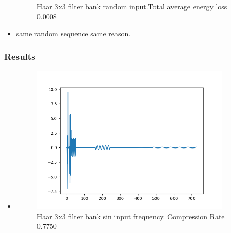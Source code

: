\documentclass{beamer}
\begin{document}
\begin{frame}
\begin{itemize}
\begin{figure}[ht!]
\begin{minipage}{0.45\textwidth}
                      \caption{Haar 3x3 filter bank random input.Total average energy loss 0.0008}
                  \end{minipage}
              \end{figure}
        \item same random sequence same reason.
    \end{itemize}
\end{frame}
\begin{frame}
    \frametitle{Results}
    \begin{itemize}
        \item
              \begin{figure}[ht!]
                  \centering
                  \begin{minipage}{0.45\textwidth}
                      \centering
                      \includegraphics[width=0.9\textwidth]{fig/Haar3Augmented1D_sin_freq.png} %
                      \caption{Haar 3x3 filter bank sin input frequency. Compression Rate 0.7750}
                      \label{fig:Haar3_sin}
                  \end{minipage}\hfill
                  \begin{minipage}{0.45\textwidth}
                      \centering

\end{minipage}
\end{figure}
\end{itemize}
\end{frame}
\end{document}
